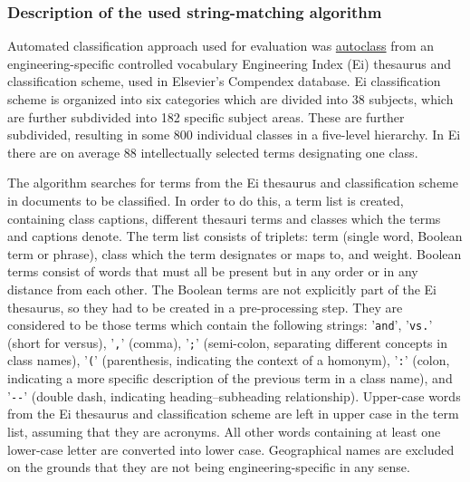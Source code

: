 \subsubsection{Description of the used string-matching algorithm}
Automated classification approach used for evaluation was \hyperref{string-matching of terms}{string-matching of terms (cf. section }{)}{autoclass} from an engineering-specific controlled vocabulary Engineering Index (Ei) thesaurus and classification scheme, used in Elsevier's Compendex database. Ei classification scheme is organized into six categories which are divided into 38 subjects, which are further subdivided into 182 specific subject areas. These are further subdivided, resulting in some 800 individual classes in a five-level hierarchy. In Ei there are on average 88 intellectually selected terms designating one class.

The algorithm searches for terms from the Ei thesaurus and classification scheme in documents to be classified. In order to do this, a term list is created, containing class captions, different thesauri terms and classes which the terms and captions denote. 	The term list consists of triplets: term (single word, Boolean term or phrase), class which the term designates or maps to, and weight. Boolean terms consist of words that must all be present but in any order or in any distance from each other. The Boolean terms are not explicitly part of the Ei thesaurus, so they had to be created in a pre-processing step. They are considered to be those terms which contain the following strings: '\verb+and+', '\verb+vs.+' (short for versus), '\verb+,+' (comma), '\verb+;+' (semi-colon, separating different concepts in class names), '\verb+(+' (parenthesis, indicating the context of a homonym), '\verb+:+' (colon, indicating a more specific description of the previous term in a class name), and '\verb+--+' (double dash, indicating heading--subheading relationship). Upper-case words from the Ei thesaurus and classification scheme are left in upper case in the term list, assuming that they are acronyms. All other words containing at least one lower-case letter are converted into lower case. Geographical names are excluded on the grounds that they are not being engineering-specific in any sense. 


